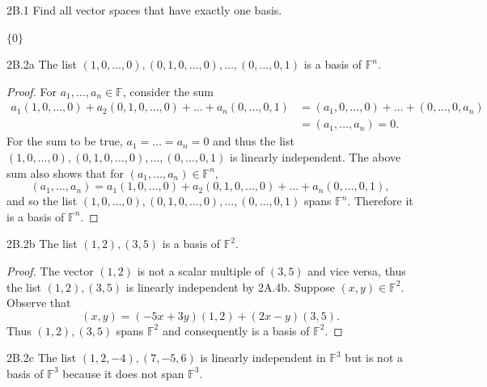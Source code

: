 \documentclass{exam}
\begin{document}
\begin{problem}{2B.1}
    Find all vector spaces that have exactly one basis.
\end{problem}

$\{0\}$

\begin{problem}{2B.2a}
    The list $(1, 0, \dots, 0), (0, 1, 0, \dots, 0), \dots, (0, \dots, 0, 1)$ is a basis of $\mathbb F^n$.
\end{problem}

\begin{proof}
    For $a_1, \dots, a_n\in\mathbb F$, consider the sum
    \begin{align*}
        a_1(1, 0, \dots, 0) + a_2(0, 1, 0, \dots, 0) + \dots + a_n(0, \dots, 0, 1) &= (a_1, 0, \dots, 0) + \dots + (0, \dots, 0, a_n)\\
        &= (a_1, \dots, a_n) = 0.
    \end{align*}
    For the sum to be true, $a_1 = \dots = a_n = 0$ and thus the list $(1, 0, \dots, 0), (0, 1, 0, \dots, 0), \dots, (0, \dots, 0, 1)$ is linearly independent. The above sum also shows that for $(a_1, \dots, a_n)\in\mathbb F^n$, \[
        (a_1, \dots, a_n) = a_1(1, 0, \dots, 0) + a_2(0, 1, 0, \dots, 0) + \dots + a_n(0, \dots, 0, 1),
    \]
    and so the list $(1, 0, \dots, 0), (0, 1, 0, \dots, 0), \dots, (0, \dots, 0, 1)$ spans $\mathbb F^n$. Therefore it is a basis of $\mathbb F^n$.
\end{proof}

\begin{problem}{2B.2b}
    The list $(1, 2), (3, 5)$ is a basis of $\mathbb F^2$.
\end{problem}

\begin{proof}
    The vector $(1, 2)$ is not a scalar multiple of $(3, 5)$ and vice versa, thus the list $(1, 2), (3, 5)$ is linearly independent by 2A.4b. Suppose $(x, y)\in\mathbb F^2$. Observe that \[
        (x, y) = (-5x+3y)(1, 2) + (2x-y)(3, 5).
    \]
    Thus $(1, 2), (3, 5)$ spans $\mathbb F^2$ and consequently is a basis of $\mathbb F^2$.
\end{proof}

\begin{problem}{2B.2c}
    The list $(1, 2, -4), (7, -5, 6)$ is linearly independent in $\mathbb F^3$ but is not a basis of $\mathbb F^3$ because it does not span $\mathbb F^3$.
\end{problem}
\end{document}
